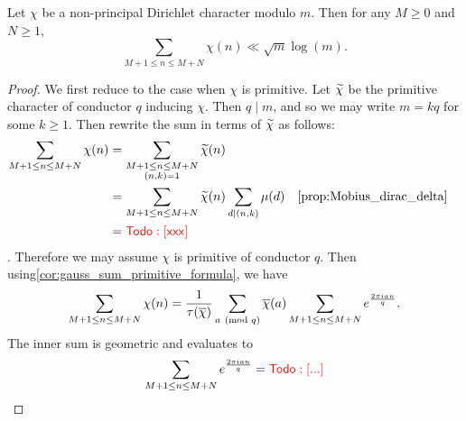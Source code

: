 \documentclass[12pt,oneside]{book}
\begin{document}
    \begin{theorem}
      Let $\chi$ be a non-principal Dirichlet character modulo $m$. Then for any $M \ge 0$ and $N \ge 1$,
      \[
        \sum_{M+1 \le n \le M+N}\chi(n) \ll \sqrt{m}\log(m).
      \]
    \end{theorem}
    \begin{proof}
      We first reduce to the case when $\chi$ is primitive. Let $\widetilde{\chi}$ be the primitive character of conductor $q$ inducing $\chi$. Then $q \mid m$, and so we may write $m = kq$ for some $k \ge 1$. Then rewrite the sum in terms of $\widetilde{\chi}$ as follows:
      \begin{align*}
        \sum_{M+1 \le n \le M+N}\chi(n) &= \sum_{\substack{M+1 \le n \le M+N \\ (n,k) = 1}}\wtilde{\chi}(n) \\
        &= \sum_{M+1 \le n \le M+N}\wtilde{\chi}(n)\sum_{d \mid (n,k)}\mu(d) && \text{\cref{prop:Mobius_dirac_delta}} \\
        &= \todo{xxx}
      \end{align*}
      . Therefore we may assume $\chi$ is primitive of conductor $q$. Then using\cref{cor:gauss_sum_primitive_formula}, we have
      \[
        \sum_{M+1 \le n \le M+N}\chi(n) = \frac{1}{\tau(\overline{\chi})}\sum_{a \ \left(\text{mod }q\right)}\overline{\chi}(a)\sum_{M+1 \le n \le M+N}e^{\frac{2\pi ian}{q}}.
      \]
      The inner sum is geometric and evaluates to
      \[
        \sum_{M+1 \le n \le M+N}e^{\frac{2\pi ian}{q}} = \textcolor{red}{\sf Todo: [...]}
      \]
    \end{proof}
\end{document}
